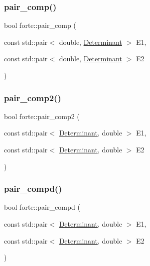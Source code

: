 \mbox{\label{namespaceforte_a7eb200760f23cf879e389c76554545bf}} 
\subsubsection{\texorpdfstring{pair\+\_\+comp()}{pair\_comp()}}
{\footnotesize\ttfamily bool forte\+::pair\+\_\+comp (\begin{DoxyParamCaption}\item[{const std\+::pair$<$ double, \mbox{\hyperlink{namespaceforte_a2076c63fd7b8732004d9e1442ce527c1}{Determinant}} $>$}]{E1,  }\item[{const std\+::pair$<$ double, \mbox{\hyperlink{namespaceforte_a2076c63fd7b8732004d9e1442ce527c1}{Determinant}} $>$}]{E2 }\end{DoxyParamCaption})}

\mbox{\label{namespaceforte_af9ecba16ab385802f7080f8931aaef40}} 
\subsubsection{\texorpdfstring{pair\+\_\+comp2()}{pair\_comp2()}}
{\footnotesize\ttfamily bool forte\+::pair\+\_\+comp2 (\begin{DoxyParamCaption}\item[{const std\+::pair$<$ \mbox{\hyperlink{namespaceforte_a2076c63fd7b8732004d9e1442ce527c1}{Determinant}}, double $>$}]{E1,  }\item[{const std\+::pair$<$ \mbox{\hyperlink{namespaceforte_a2076c63fd7b8732004d9e1442ce527c1}{Determinant}}, double $>$}]{E2 }\end{DoxyParamCaption})}

\mbox{\label{namespaceforte_ac45031ee40d401057e0b4c2861a1858c}} 
\subsubsection{\texorpdfstring{pair\+\_\+compd()}{pair\_compd()}}
{\footnotesize\ttfamily bool forte\+::pair\+\_\+compd (\begin{DoxyParamCaption}\item[{const std\+::pair$<$ \mbox{\hyperlink{namespaceforte_a2076c63fd7b8732004d9e1442ce527c1}{Determinant}}, double $>$}]{E1,  }\item[{const std\+::pair$<$ \mbox{\hyperlink{namespaceforte_a2076c63fd7b8732004d9e1442ce527c1}{Determinant}}, double $>$}]{E2 }\end{DoxyParamCaption})}

